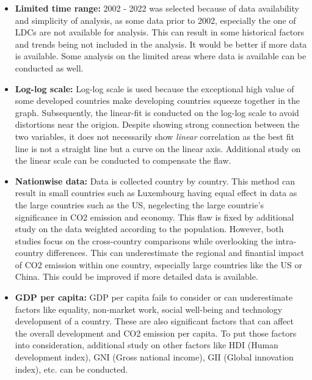 \documentclass[a4paper]{article}
\begin{document}
\begin{itemize}
    \item \textbf{Limited time range:} 2002 - 2022 was selected because of data availability and simplicity of analysis, as some data prior to 2002, especially the one of LDCs are not available for analysis. This can result in some historical factors and trends being not included in the analysis. It would be better if more data is available. Some analysis on the limited areas where data is available can be conducted as well.
    \item \textbf{Log-log scale:} Log-log scale is used because the exceptional high value of some developed countries make developing countries squeeze together in the graph. Subsequently, the linear-fit is conducted on the log-log scale to avoid distortions near the origion. Despite showing strong connection between the two variables, it does not necessarily show \textit{linear} correlation as the best fit line is not a straight line but a curve on the linear axis. Additional study on the linear scale can be conducted to compensate the flaw.
    \item \textbf{Nationwise data:} Data is collected country by country. This method can result in small countries such as Luxembourg having equal effect in data as the large countries such as the US, negelecting the large countrie's significance in CO2 emission and economy. This flaw is fixed by additional study on the data weighted according to the population. However, both studies focus on the cross-country comparisons while overlooking the intra-country differences. This can underestimate the regional and finantial impact of CO2 emission within one country, especially large countries like the US or China. This could be improved if more detailed data is available.
    \item \textbf{GDP per capita:} GDP per capita fails to consider or can underestimate factors like equality, non-market work, social well-being and technology development of a country. These are also significant factors that can affect the overall development and CO2 emission per capita. To put those factors into consideration, additional study on other factors like HDI (Human development index), GNI (Gross national income), GII (Global innovation index), etc. can be conducted.
\end{itemize}




\end{document}
